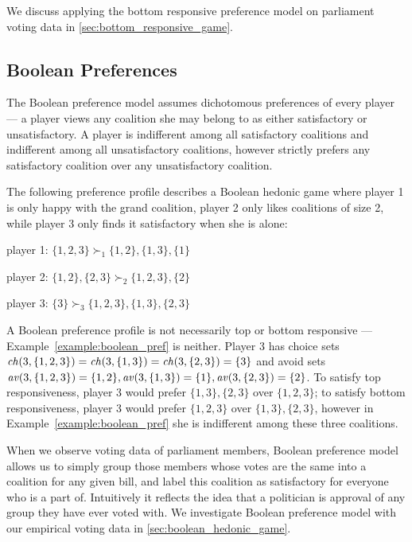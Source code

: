 We discuss applying the bottom responsive preference model on parliament voting
data in \autoref{sec:bottom_responsive_game}.

\subsection{Boolean Preferences}
\label{subsec:boolean_preferences}
The Boolean preference model assumes dichotomous preferences of every player ---
a player views any coalition she may belong to as either satisfactory or
unsatisfactory.
A player is indifferent among all satisfactory coalitions and indifferent
among all unsatisfactory coalitions, however strictly prefers any satisfactory
coalition over any unsatisfactory coalition.

\begin{example}
\label{example:boolean_pref}
  The following preference profile describes a Boolean hedonic game where
  player 1 is only happy with the grand coalition, player 2 only likes coalitions
  of size 2, while player 3 only finds it satisfactory when she is alone:

  player 1: $\{1, 2, 3\} \succ_1 \{1, 2\}, \{1, 3\}, \{1\}$

  player 2: $\{1, 2\}, \{2, 3\} \succ_2 \{1, 2, 3\}, \{2\}$

  player 3: $\{3\} \succ_3 \{1, 2, 3\}, \{1, 3\}, \{2, 3\}$
\end{example}

A Boolean preference profile is not necessarily top or bottom responsive ---
Example~\ref{example:boolean_pref} is neither.
Player 3 has choice sets
$\mathit{ch}(3, \{1, 2, 3\}) = \mathit{ch}(3, \{1, 3\}) = \mathit{ch}(3, \{2, 3\}) = \{3\}$ and avoid sets
$\mathit{av}(3, \{1, 2, 3\}) = \{1, 2\}, \mathit{av}(3, \{1, 3\}) = \{1\},
\mathit{av}(3, \{2, 3\}) = \{2\}$.
To satisfy top responsiveness, player 3 would prefer $\{1, 3\}, \{2, 3\}$ over
$\{1, 2, 3\}$; to satisfy bottom responsiveness, player 3 would prefer
$\{1, 2, 3\}$ over $\{1, 3\}, \{2, 3\}$, however in
Example~\ref{example:boolean_pref} she is indifferent among these three
coalitions.

When we observe voting data of parliament members, Boolean preference model
allows us to simply group those members whose votes are the same into a
coalition for any given bill, and label this coalition as satisfactory for
everyone who is a part of.
Intuitively it reflects the idea that a politician is approval of any group
they have ever voted with.
We investigate Boolean preference model with our empirical voting data in
\autoref{sec:boolean_hedonic_game}.


